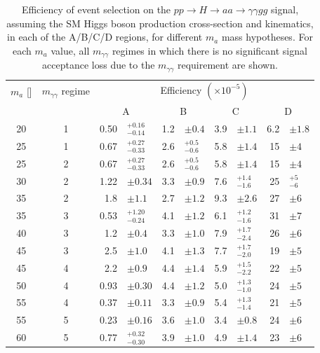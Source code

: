 \begin{table}[t]
  \begin{center}
    \caption{Efficiency of event selection on the $pp\to H\to aa \to \gamma\gamma gg$ signal, 
      assuming the SM Higgs boson production cross-section and kinematics,
      in each of the A/B/C/D regions, for different $m_a$ mass hypotheses.
      For each $m_a$ value, all $m_{\gamma\gamma}$ regimes in which there is no significant signal acceptance loss due to the $m_{\gamma\gamma}$ requirement are shown.
    }
    \label{tab:ABCD}
    \footnotesize
    \bgroup
    \def\arraystretch{1.5}
    \begin{tabular}{
        c
        c
        r@{}l
        r@{}l
        r@{}l
        r@{}l
      }
      \hline
      {$m_a$ [\GeV{}]} & {$m_{\gamma\gamma}$ regime} & \multicolumn{8}{c}{Efficiency $(\times 10^{-5})$}  \\
      & & \multicolumn{2}{c}{A} & \multicolumn{2}{c}{B} & \multicolumn{2}{c}{C} & \multicolumn{2}{c}{D}  \\
      \hline
      20 & 1 & 0.50&$^{+0.16}_{-0.14}$ & 1.2&$\pm0.4$ & 3.9&$\pm1.1$           & 6.2&$\pm1.8$           \\
      25 & 1 & 0.67&$^{+0.27}_{-0.33}$ & 2.6&$^{+0.5}_{-0.6}$ & 5.8&$\pm1.4$           & 15&$\pm4$           \\ 
      25 & 2 & 0.67&$^{+0.27}_{-0.33}$ & 2.6&$^{+0.5}_{-0.6}$ & 5.8&$\pm1.4$           & 15&$\pm4$           \\ 
      30 & 2 & 1.22&$\pm0.34$           & 3.3&$\pm0.9$          & 7.6&$^{+1.4}_{-1.6}$   & 25&$^{+5}_{-6}$   \\
      35 & 2 & 1.8&$\pm1.1$            & 2.7&$\pm1.2$           & 9.3&$\pm2.6$           & 27&$\pm6$           \\ 
      35 & 3 & 0.53&$^{+1.20}_{-0.24}$  & 4.1&$\pm1.2$           & 6.1&$^{+1.2}_{-1.6}$   & 31&$\pm7$           \\
      40 & 3 &  1.2&$\pm0.4$           & 3.3&$\pm1.0$           & 7.9&$^{+1.7}_{-2.4}$   & 26&$\pm6$           \\
      45 & 3 & 2.5&$\pm1.0$           & 4.1&$\pm1.3$           & 7.7&$^{+1.7}_{-2.0}$   & 19&$\pm5$           \\ 
      45 & 4 & 2.2&$\pm0.9$  & 4.4&$\pm1.4$           & 5.9&$^{+1.5}_{-2.2}$   & 22&$\pm5$           \\ 
      50 & 4 &  0.93&$\pm0.30$           & 4.4&$\pm1.2$           & 5.0&$^{+1.3}_{-1.0}$   & 24&$\pm5$   \\
      55 & 4 & 0.37&$\pm0.11$          & 3.3&$\pm0.9$          & 5.4&$^{+1.3}_{-1.4}$   & 21&$\pm5$           \\ 
      55 & 5 & 0.23&$\pm0.16$          & 3.6&$\pm1.0$          & 3.4&$\pm0.8$          & 24&$\pm6$           \\ 
      60 & 5 &  0.77&$^{+0.32}_{-0.30}$  & 3.9&$\pm1.0$           & 4.9&$\pm1.4$           & 23&$\pm6$           \\
      \hline
    \end{tabular}
    \egroup
  \end{center}
\end{table}

